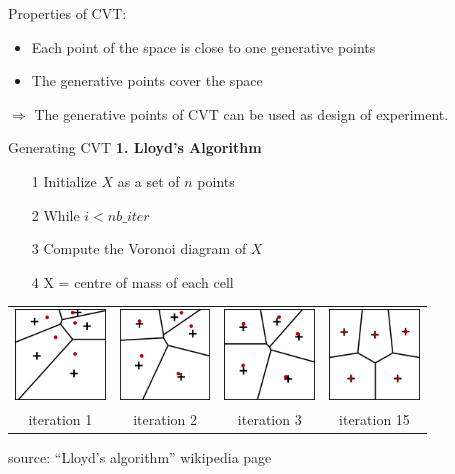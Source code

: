 \documentclass{beamer}
\begin{document}
\begin{frame}{}

Properties of CVT:
\begin{itemize}
	\item Each point of the space is close to one generative points
	\item The generative points cover the space
\end{itemize}
$\Rightarrow$ The generative points of CVT can be used as design of experiment.
\end{frame}

\begin{frame}{Generating CVT }
\textbf{1. Lloyd's Algorithm}
\begin{itemize}
	\item[1] Initialize $X$ as a set of $n$ points
	\item[2] While $i<nb\_iter$ 
	\item[3] \qquad Compute the Voronoi diagram of $X$
	\item[4] \qquad X = centre of mass of each cell
\end{itemize}
\begin{center}
  \begin{tabular}{cccc}
\includegraphics[height=2.4cm]{figures/Lloyds1}&
\includegraphics[height=2.4cm]{figures/Lloyds2}&
\includegraphics[height=2.4cm]{figures/Lloyds3}&
\includegraphics[height=2.4cm]{figures/Lloyds15}\\
iteration 1 & iteration 2 &iteration 3 &iteration 15
  \end{tabular}
\end{center}
source: ``Lloyd's algorithm'' wikipedia page
\end{frame}
\end{document}
